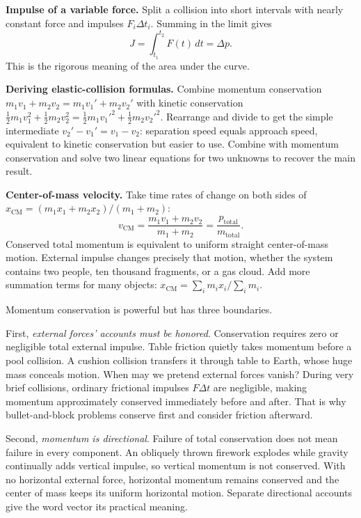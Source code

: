 \begin{mathbridge}
\textbf{Impulse of a variable force.} Split a collision into short intervals with nearly constant force and impulses \(F_i\Delta t_i\). Summing in the limit gives
\[
J=\int_{t_1}^{t_2} F(t)\,dt=\Delta p .
\]
This is the rigorous meaning of the area under the curve.

\textbf{Deriving elastic-collision formulas.} Combine momentum conservation \(m_1v_1+m_2v_2=m_1v_1'+m_2v_2'\) with kinetic conservation \(\tfrac12 m_1v_1^2+\tfrac12 m_2v_2^2=\tfrac12 m_1v_1'^2+\tfrac12 m_2v_2'^2\). Rearrange and divide to get the simple intermediate \(v_2'-v_1'=v_1-v_2\): separation speed equals approach speed, equivalent to kinetic conservation but easier to use. Combine with momentum conservation and solve two linear equations for two unknowns to recover the main result.

\textbf{Center-of-mass velocity.} Take time rates of change on both sides of \(x_{\text{CM}}=(m_1x_1+m_2x_2)/(m_1+m_2)\):
\[
v_{\text{CM}}=\frac{m_1v_1+m_2v_2}{m_1+m_2}=\frac{p_{\text{total}}}{m_{\text{total}}}.
\]
Conserved total momentum is equivalent to uniform straight center-of-mass motion. External impulse changes precisely that motion, whether the system contains two people, ten thousand fragments, or a gas cloud. Add more summation terms for many objects: \(x_{\text{CM}}=\sum_i m_ix_i/\sum_i m_i\).
\end{mathbridge}


Momentum conservation is powerful but has three boundaries.

First, \emph{external forces' accounts must be honored}. Conservation requires zero or negligible total external impulse. Table friction quietly takes momentum before a pool collision. A cushion collision transfers it through table to Earth, whose huge mass conceals motion. When may we pretend external forces vanish? During very brief collisions, ordinary frictional impulses \(F\Delta t\) are negligible, making momentum approximately conserved immediately before and after. That is why bullet-and-block problems conserve first and consider friction afterward.

Second, \emph{momentum is directional}. Failure of total conservation does not mean failure in every component. An obliquely thrown firework explodes while gravity continually adds vertical impulse, so vertical momentum is not conserved. With no horizontal external force, horizontal momentum remains conserved and the center of mass keeps its uniform horizontal motion. Separate directional accounts give the word vector its practical meaning.

